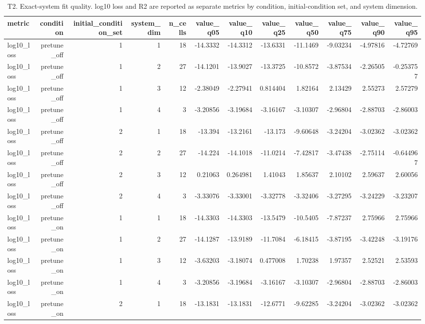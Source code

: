 \begin{table}[htbp]
\centering
\caption{T2. Exact-system fit quality. log10 loss and R2 are reported as separate metrics by condition, initial-condition set, and system dimension.}
\begin{tabular}{lrrrrrrrrrrr}
\toprule
metric & condition & initial\_condition\_set & system\_dim & n\_cells & value\_q05 & value\_q10 & value\_q25 & value\_q50 & value\_q75 & value\_q90 & value\_q95 \\
\midrule
log10\_loss & pretune\_off & 1 & 1 & 18 & -14.3332 & -14.3312 & -13.6331 & -11.1469 & -9.03234 & -4.97816 & -4.72769 \\
log10\_loss & pretune\_off & 1 & 2 & 27 & -14.1201 & -13.9027 & -13.3725 & -10.8572 & -3.87534 & -2.26505 & -0.253757 \\
log10\_loss & pretune\_off & 1 & 3 & 12 & -2.38049 & -2.27941 & 0.814404 & 1.82164 & 2.13429 & 2.55273 & 2.57279 \\
log10\_loss & pretune\_off & 1 & 4 & 3 & -3.20856 & -3.19684 & -3.16167 & -3.10307 & -2.96804 & -2.88703 & -2.86003 \\
log10\_loss & pretune\_off & 2 & 1 & 18 & -13.394 & -13.2161 & -13.173 & -9.60648 & -3.24204 & -3.02362 & -3.02362 \\
log10\_loss & pretune\_off & 2 & 2 & 27 & -14.224 & -14.1018 & -11.0214 & -7.42817 & -3.47438 & -2.75114 & -0.644967 \\
log10\_loss & pretune\_off & 2 & 3 & 12 & 0.21063 & 0.264981 & 1.41043 & 1.85637 & 2.10102 & 2.59637 & 2.60056 \\
log10\_loss & pretune\_off & 2 & 4 & 3 & -3.33076 & -3.33001 & -3.32778 & -3.32406 & -3.27295 & -3.24229 & -3.23207 \\
log10\_loss & pretune\_on & 1 & 1 & 18 & -14.3303 & -14.3303 & -13.5479 & -10.5405 & -7.87237 & 2.75966 & 2.75966 \\
log10\_loss & pretune\_on & 1 & 2 & 27 & -14.1287 & -13.9189 & -11.7084 & -6.18415 & -3.87195 & -3.42248 & -3.19176 \\
log10\_loss & pretune\_on & 1 & 3 & 12 & -3.63203 & -3.18074 & 0.477008 & 1.70238 & 1.97357 & 2.52521 & 2.53593 \\
log10\_loss & pretune\_on & 1 & 4 & 3 & -3.20856 & -3.19684 & -3.16167 & -3.10307 & -2.96804 & -2.88703 & -2.86003 \\
log10\_loss & pretune\_on & 2 & 1 & 18 & -13.1831 & -13.1831 & -12.6771 & -9.62285 & -3.24204 & -3.02362 & -3.02362 \\

\end{tabular}
\end{table}
